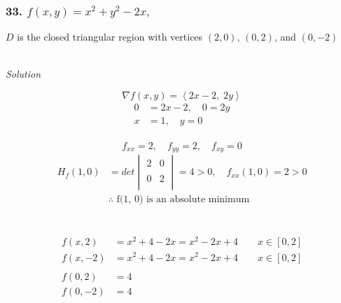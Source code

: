 \documentclass{article}
\newcommand\vv[1]{\left\langle #1 \right\rangle}
\newcommand{\solution}{\centerline{\textit{Solution}}}
\newcommand{\also}{,\quad}
\begin{document}
{{{\subsubsection*{33. $f(x,y) = x^2+y^2-2x,\quad$}
$D$ is the closed triangular
region with vertices $(2,0)$, $(0,2)$, and $(0,-2)$ \\\\
\solution
\vspace{1em}
\[
    \nabla f(x,y) = \vv{2x-2,\; 2y}
\]
\begin{align*}
    0 &= 2x- 2 \also 0 = 2y \\
    x &= 1 \also y = 0
\end{align*}
 \\
\[
    f_{xx}=2\also f_{yy} = 2\also f_{xy} = 0
\]
\begin{align*}
    H_f(1,0) &= det\begin{vmatrix}
    2 & 0 \\\\
    0 & 2 \\
\end{vmatrix} = 4 > 0\also f_{xx}(1,0)=2 > 0 \\
             &\therefore\text{ f(1, 0) is an absolute minimum}
\end{align*}
\\\\
\begin{align*}
    f(x, 2) &= x^2 + 4 - 2x = x^2 -2x+4\qquad x\in [0,2] \\
    f(x, -2) &= x^2 + 4 - 2x = x^2 -2x+4\qquad x\in [0,2] \\\\
    f(0,2) &= 4 \\
    f(0,-2) &= 4
\end{align*}
}}}
\end{document}
